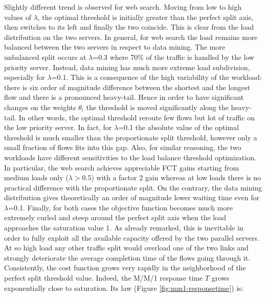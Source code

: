 Slightly different trend is observed for web search. Moving from low to high values of $\lambda$, the optimal threshold is initially greater than the perfect split axis, then switches to its left and finally the two coincide. This is clear from the load distribution on the two servers. In general, for web search the load remains more balanced between the two servers in respect to data mining. The more unbalanced split occurs at $\lambda$=0.3 where 70\% of the traffic is handled by the low priority server. Instead, data mining has much more extreme load subdivision, especially for $\lambda$=0.1. This is a consequence of the high variability of the workload: there is six order of magnitude difference between the shortest and the longest flow and there is a pronounced heavy-tail. Hence in order to have significant changes on the weights $\theta_i$ the threshold is moved significantly along the heavy-tail. In other words, the optimal threshold reroute few flows but lot of traffic on the low priority server. In fact, for $\lambda$=0.1 the absolute value of the optimal threshold is much smaller than the proportionate split threshold, however only a small fraction of flows fits into this gap. Also, for similar reasoning, the two workloads have different sensitivities to the load balance threshold optimization. In particular, the web search achieves appreciable FCT gains starting from medium loads only ($\lambda > 0.5$) with a factor 2 gain%
whereas at low loads there is no practical difference with the proportionate split. On the contrary, the data mining distribution gives theoretically an order of magnitude %
lower waiting time even for $\lambda$=0.1. %
Finally, for both cases the objective function becomes much more extremely curled and steep around the perfect split axis when the load approaches the saturation value 1.  As already remarked, this is inevitable in order to fully exploit all the available capacity offered by the two parallel servers. At so high load any other traffic split would overload one of the two links and strongly deteriorate the average completion time of the flows going through it. Consistently, the cost function grows very rapidly in the neighborhood of the perfect split threshold value. Indeed, the M/M/1 response time $T$ grows exponentially close to saturation. Its law (Figure \ref{fig:mm1-responsetime}) is:
